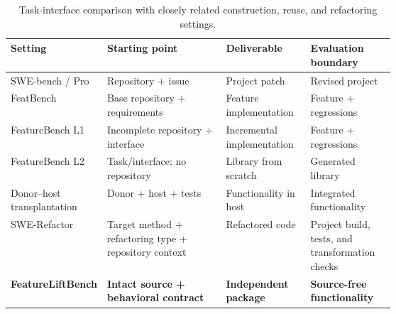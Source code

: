 \begin{table}[tbp]
  \caption{Task-interface comparison with closely related construction, reuse,
  and refactoring settings.}
  \label{tab:task-comparison}
  \centering
  \footnotesize
  \setlength{\tabcolsep}{3.6pt}
  \renewcommand{\arraystretch}{1.08}
  \begin{tabularx}{0.94\linewidth}{
    @{}
    >{\raggedright\arraybackslash}p{0.19\linewidth}
    >{\raggedright\arraybackslash}X
    >{\raggedright\arraybackslash}p{0.22\linewidth}
    >{\raggedright\arraybackslash}p{0.22\linewidth}
    @{}
  }
    \toprule
    Setting & Starting point & Deliverable & Evaluation boundary \\
    \midrule
    SWE-bench / Pro
      & Repository + issue
      & Project patch
      & Revised project \\
    FeatBench
      & Base repository + requirements
      & Feature implementation
      & Feature + regressions \\
    FeatureBench L1
      & Incomplete repository + interface
      & Incremental implementation
      & Feature + regressions \\
    FeatureBench L2
      & Task/interface; no repository
      & Library from scratch
      & Generated library \\
    Donor--host transplantation
      & Donor + host + tests
      & Functionality in host
      & Integrated functionality \\
    SWE-Refactor
      & Target method + refactoring type + repository context
      & Refactored code
      & Project build, tests, and transformation checks \\
    \midrule
    \textbf{FeatureLiftBench}
      & \textbf{Intact source + behavioral contract}
      & \textbf{Independent package}
      & \textbf{Source-free functionality} \\
    \bottomrule
  \end{tabularx}
\end{table}

